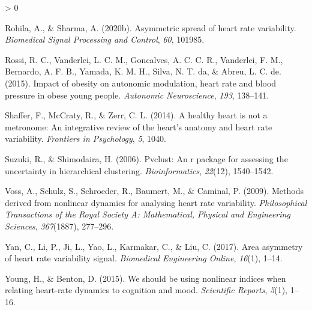 \documentclass[
  english,
  jou,floatsintext]{apa6}
\newlength{\cslhangindent}
\newenvironment{CSLReferences}[2] %
 {%
  \setlength{\parindent}{0pt}
  \ifodd #1 \everypar{\setlength{\hangindent}{\cslhangindent}}\ignorespaces\fi
  \ifnum #2 > 0
  \setlength{\parskip}{#2\baselineskip}
  \fi
 }%
 {}
\begin{document}
\begin{CSLReferences}{1}{0}
\leavevmode\hypertarget{ref-rohila2020asymmetric}{}%
Rohila, A., \& Sharma, A. (2020b). Asymmetric spread of heart rate variability. \emph{Biomedical Signal Processing and Control}, \emph{60}, 101985.

\leavevmode\hypertarget{ref-rossi2015impact}{}%
Rossi, R. C., Vanderlei, L. C. M., Goncalves, A. C. C. R., Vanderlei, F. M., Bernardo, A. F. B., Yamada, K. M. H., Silva, N. T. da, \& Abreu, L. C. de. (2015). Impact of obesity on autonomic modulation, heart rate and blood pressure in obese young people. \emph{Autonomic Neuroscience}, \emph{193}, 138--141.

\leavevmode\hypertarget{ref-shaffer2014healthy}{}%
Shaffer, F., McCraty, R., \& Zerr, C. L. (2014). A healthy heart is not a metronome: An integrative review of the heart's anatomy and heart rate variability. \emph{Frontiers in Psychology}, \emph{5}, 1040.

\leavevmode\hypertarget{ref-suzuki2006pvclust}{}%
Suzuki, R., \& Shimodaira, H. (2006). Pvclust: An r package for assessing the uncertainty in hierarchical clustering. \emph{Bioinformatics}, \emph{22}(12), 1540--1542.

\leavevmode\hypertarget{ref-voss2009methods}{}%
Voss, A., Schulz, S., Schroeder, R., Baumert, M., \& Caminal, P. (2009). Methods derived from nonlinear dynamics for analysing heart rate variability. \emph{Philosophical Transactions of the Royal Society A: Mathematical, Physical and Engineering Sciences}, \emph{367}(1887), 277--296.

\leavevmode\hypertarget{ref-yan2017area}{}%
Yan, C., Li, P., Ji, L., Yao, L., Karmakar, C., \& Liu, C. (2017). Area asymmetry of heart rate variability signal. \emph{Biomedical Engineering Online}, \emph{16}(1), 1--14.

\leavevmode\hypertarget{ref-young2015we}{}%
Young, H., \& Benton, D. (2015). We should be using nonlinear indices when relating heart-rate dynamics to cognition and mood. \emph{Scientific Reports}, \emph{5}(1), 1--16.

\end{CSLReferences}

\newpage
\end{document}
